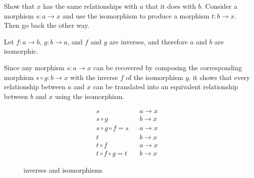 \begin{ttta}
	Show that $x$ has the same relationships with $a$ that it does with $b$.
	Consider a morphism $s: a\rightarrow x$ and use the isomorphism to produce a
	morphism $t: b\rightarrow x$. Then go back the other way.
\end{ttta}
\begin{proofitem}
	\item Let $f:a\rightarrow b$, $g:b\rightarrow a$, and $f$ and $g$ are inverses,
	and therefore $a$ and $b$ are isomorphic.
	\item
	Since any morphism $s: a \rightarrow x$ can be recovered by composing the
	corresponding morphism $s \circ g : b \rightarrow x$ with the inverse
	$f$ of the isomorphism $g$, it shows that every relationship between $a$ and
	$x$ can be translated into an equivalent relationship between $b$ and $x$
	using the isomorphism.
\end{proofitem}
\setcounter{equation}{0}
\begin{align}
	s                    &  & a\rightarrow x \\
	s\circ g             &  & b\rightarrow x \\
	s\circ g \circ f = s &  & a\rightarrow x \\
	t                    &  & b\rightarrow x \\
	t\circ f             &  & a\rightarrow x \\
	t\circ f \circ g = t &  & b\rightarrow x
\end{align}
\begin{figure}[H]
	\begin{center}
		
	\end{center}
	\caption{inverses and isomorphisms}
\end{figure}

